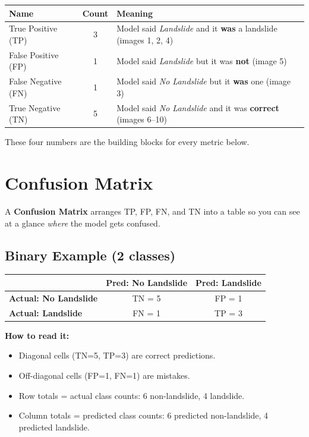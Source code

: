 \documentclass[11pt]{article}
\begin{document}
\begin{center}
\renewcommand{\arraystretch}{1.3}
\begin{tabular}{lcp{7.5cm}}
\toprule
\textbf{Name} & \textbf{Count} & \textbf{Meaning} \\
\midrule
True Positive (TP)  & 3 & Model said \textit{Landslide} and it \textbf{was} a landslide (images 1, 2, 4) \\
False Positive (FP) & 1 & Model said \textit{Landslide} but it was \textbf{not} (image 5) \\
False Negative (FN) & 1 & Model said \textit{No Landslide} but it \textbf{was} one (image 3) \\
True Negative (TN)  & 5 & Model said \textit{No Landslide} and it was \textbf{correct} (images 6--10) \\
\bottomrule
\end{tabular}
\end{center}

\noindent These four numbers are the building blocks for every metric below.

\section{Confusion Matrix}

A \textbf{Confusion Matrix} arranges TP, FP, FN, and TN into a table so you can see at a glance \emph{where} the model gets confused.

\subsection{Binary Example (2 classes)}

\begin{center}
\begin{tabular}{l|cc}
 & \textbf{Pred: No Landslide} & \textbf{Pred: Landslide} \\ \hline
\textbf{Actual: No Landslide} & TN = 5 & FP = 1 \\
\textbf{Actual: Landslide}    & FN = 1 & TP = 3 \\
\end{tabular}
\end{center}

\noindent\textbf{How to read it:}
\begin{itemize}[noitemsep]
    \item Diagonal cells (TN=5, TP=3) are \textcolor{green!60!black}{correct predictions}.
    \item Off-diagonal cells (FP=1, FN=1) are \textcolor{red!70!black}{mistakes}.
    \item Row totals = actual class counts: 6 non-landslide, 4 landslide.
    \item Column totals = predicted class counts: 6 predicted non-landslide, 4 predicted landslide.
\end{itemize}
\end{document}
